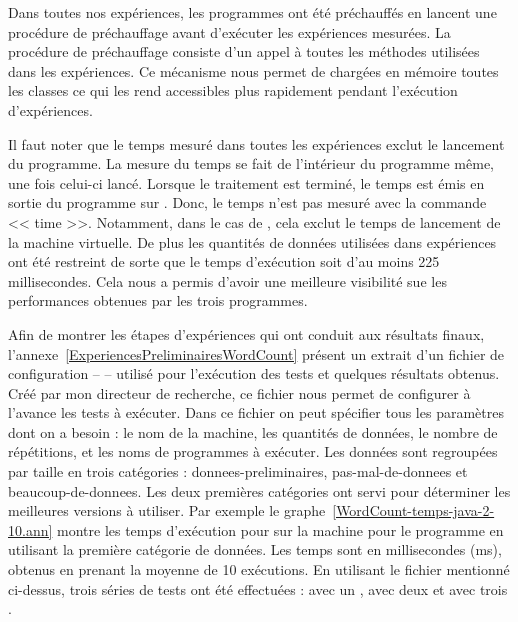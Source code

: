 Dans toutes nos exp\'eriences, les programmes  ont \'et\'e pr\'echauff\'es en lancent une proc\'edure de pr\'echauffage avant d'ex\'ecuter les exp\'eriences mesur\'ees. La proc\'edure de pr\'echauffage consiste d'un appel \`a toutes les m\'ethodes utilis\'ees dans les exp\'eriences. Ce m\'ecanisme nous permet de charg\'ees en m\'emoire toutes les classes ce qui les rend accessibles plus rapidement pendant l'ex\'ecution d'exp\'eriences.
 
Il faut noter que le temps mesur\'e dans toutes les exp\'eriences exclut le lancement du programme. La mesure du temps se fait de l'int\'erieur du programme m\^eme, une fois celui-ci lanc\'e. Lorsque le traitement est termin\'e, le temps est \'emis en sortie du programme sur . Donc, le temps n'est pas mesur\'e avec la commande << time >>. Notamment, dans le cas de , cela exclut le temps de lancement de la machine virtuelle. De plus les quantit\'es de donn\'ees utilis\'ees dans exp\'eriences ont \'et\'e restreint de sorte que le temps d'ex\'ecution soit d'au moins 225 millisecondes. Cela nous a permis d'avoir une meilleure visibilit\'e sue les performances obtenues par les trois programmes. 

Afin de montrer les \'etapes d'exp\'eriences qui ont conduit aux r\'esultats finaux, l'annexe~\ref{ExperiencesPreliminairesWordCount} pr\'esent un extrait d'un fichier de configuration --  -- utilis\'e pour l'ex\'ecution des tests et quelques r\'esultats obtenus. Cr\'e\'e par mon directeur de recherche, ce fichier nous permet de configurer \`a l'avance les tests \`a ex\'ecuter. Dans ce fichier on peut sp\'ecifier tous les param\`etres dont on a besoin : le nom de la machine, les quantités de donn\'ees, le nombre de r\'ep\'etitions, et les noms de programmes \`a ex\'ecuter. Les donn\'ees sont regroup\'ees par taille en trois cat\'egories : donnees-preliminaires, pas-mal-de-donnees et beaucoup-de-donnees. Les deux premi\`eres cat\'egories ont servi pour d\'eterminer les meilleures versions \`a utiliser. Par exemple le graphe~\ref{WordCount-temps-java-2-10.ann} montre les temps d'ex\'ecution pour  sur la machine  pour le programme  en utilisant la premi\`ere cat\'egorie de donn\'ees. Les temps sont en millisecondes (ms), obtenus en prenant la moyenne de 10 ex\'ecutions.  En utilisant le fichier mentionn\'e ci-dessus, trois s\'eries de tests ont \'et\'e effectu\'ees :  avec un ,  avec deux  et  avec trois . 

